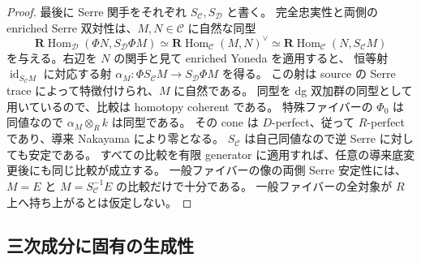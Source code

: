\begin{proof}
最後に Serre 関手をそれぞれ $S_{\mathcal C},S_{\mathcal D}$ と書く。
完全忠実性と両側の enriched Serre 双対性は、$M,N\in\mathcal C$ に自然な同型
\[
 \mathbf R\operatorname{Hom}_{\mathcal D}(\Phi N,S_{\mathcal D}\Phi M)
 \simeq\mathbf R\operatorname{Hom}_{\mathcal C}(M,N)^\vee
 \simeq
 \mathbf R\operatorname{Hom}_{\mathcal C}(N,S_{\mathcal C}M)
\]
を与える。右辺を $N$ の関手と見て enriched Yoneda を適用すると、
恒等射 $\operatorname{id}_{S_{\mathcal C}M}$ に対応する射
$\alpha_M:\Phi S_{\mathcal C}M\to S_{\mathcal D}\Phi M$ を得る。
この射は source の Serre trace によって特徴付けられ、$M$ に自然である。
同型を dg 双加群の同型として用いているので、比較は homotopy coherent である。
特殊ファイバーの $\Phi_0$ は同値なので $\alpha_M\otimes_R k$ は同型である。
その cone は $D$-perfect、従って $R$-perfect であり、導来 Nakayama により零となる。
$S_{\mathcal C}$ は自己同値なので逆 Serre に対しても安定である。
すべての比較を有限 generator に適用すれば、任意の導来底変更後にも同じ比較が成立する。
一般ファイバーの像の両側 Serre 安定性には、$M=E$ と
$M=S_{\mathcal C}^{-1}E$ の比較だけで十分である。
一般ファイバーの全対象が $R$ 上へ持ち上がるとは仮定しない。
\end{proof}

\subsection{三次成分に固有の生成性}

